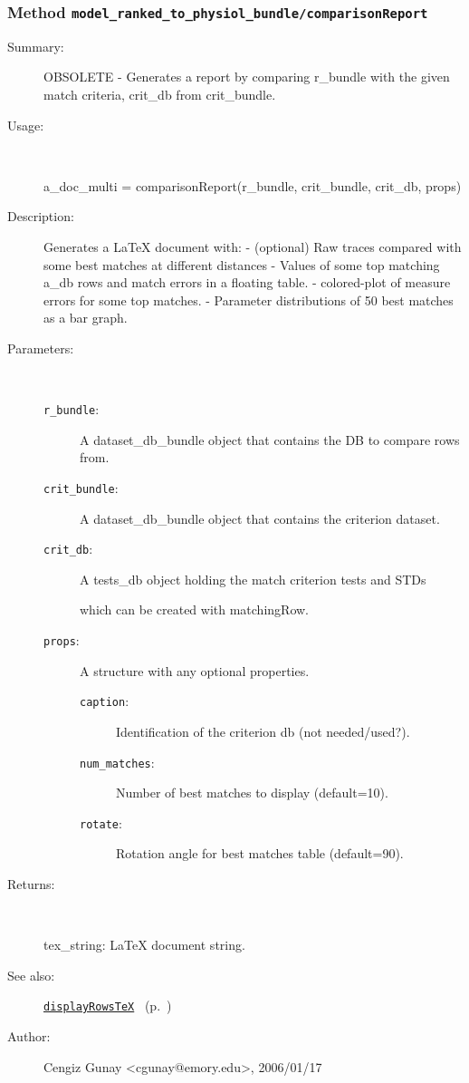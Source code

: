 \subsubsection[Method \texttt{comparisonReport}]{Method \texttt{model\_ranked\_to\_physiol\_bundle/comparisonReport}}%
%
\label{ref_model_ranked_to_physiol_bundle__comparisonReport}%
\hypertarget{ref_model_ranked_to_physiol_bundle__comparisonReport}{}%
\begin{description}
\item[Summary:]OBSOLETE - Generates a report by comparing r\_bundle with the given match criteria, crit\_db from crit\_bundle.
%
\item[Usage:]~%
\begin{lyxcode}%
a\_doc\_multi = comparisonReport(r\_bundle, crit\_bundle, crit\_db, props)
%
\end{lyxcode}%
%
\item[Description:]%
Generates a LaTeX document with:
	- (optional) Raw traces compared with some best matches at different distances
	- Values of some top matching a\_db rows and match errors in a floating table.
	- colored-plot of measure errors for some top matches.
	- Parameter distributions of 50 best matches as a bar graph.
\item[Parameters:]~
\begin{description}%
\item[\texttt{r\_bundle}:]
 A dataset\_db\_bundle object that contains the DB to compare rows from.
\item[\texttt{crit\_bundle}:]
 A dataset\_db\_bundle object that contains the criterion dataset.
\item[\texttt{crit\_db}:]
 A tests\_db object holding the match criterion tests and STDs

which can be created with matchingRow.
\item[\texttt{props}:]
 A structure with any optional properties.
\begin{description}%
\item[\texttt{caption}:]
 Identification of the criterion db (not needed/used?).
\item[\texttt{num\_matches}:]
 Number of best matches to display (default=10).
\item[\texttt{rotate}:]
 Rotation angle for best matches table (default=90).
\end{description}%
\end{description}%
%
\item[Returns:
]~

	tex\_string: LaTeX document string.
%
%
\item[See also:]%
\hyperlink{ref_displayRowsTeX}{\texttt{displayRowsTeX}}%
\ (p.~\pageref{ref_displayRowsTeX})%
%
%
\item[Author:]%
Cengiz Gunay <cgunay@emory.edu>, 2006/01/17
%
\end{description}
\methodline%
